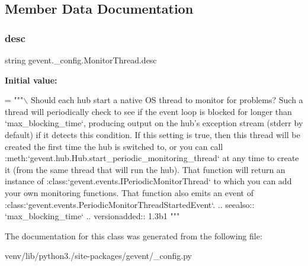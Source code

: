 \subsection{Member Data Documentation}
\mbox{\label{classgevent_1_1__config_1_1_monitor_thread_aee95dd332101471a7376df85a83ef546}} 
\subsubsection{\texorpdfstring{desc}{desc}}
{\footnotesize\ttfamily string gevent.\+\_\+config.\+Monitor\+Thread.\+desc\hspace{0.3cm}{\ttfamily [static]}}

{\bfseries Initial value\+:}
\begin{DoxyCode}
=  \textcolor{stringliteral}{"""\(\backslash\)}
\textcolor{stringliteral}{Should each hub start a native OS thread to monitor}
\textcolor{stringliteral}{for problems?}
\textcolor{stringliteral}{}
\textcolor{stringliteral}{Such a thread will periodically check to see if the event loop}
\textcolor{stringliteral}{is blocked for longer than `max\_blocking\_time`, producing output on}
\textcolor{stringliteral}{the hub's exception stream (stderr by default) if it detects this condition.}
\textcolor{stringliteral}{}
\textcolor{stringliteral}{If this setting is true, then this thread will be created}
\textcolor{stringliteral}{the first time the hub is switched to,}
\textcolor{stringliteral}{or you can call :meth:`gevent.hub.Hub.start\_periodic\_monitoring\_thread` at any}
\textcolor{stringliteral}{time to create it (from the same thread that will run the hub). That function}
\textcolor{stringliteral}{will return an instance of :class:`gevent.events.IPeriodicMonitorThread`}
\textcolor{stringliteral}{to which you can add your own monitoring functions. That function}
\textcolor{stringliteral}{also emits an event of :class:`gevent.events.PeriodicMonitorThreadStartedEvent`.}
\textcolor{stringliteral}{}
\textcolor{stringliteral}{.. seealso:: `max\_blocking\_time`}
\textcolor{stringliteral}{}
\textcolor{stringliteral}{.. versionadded:: 1.3b1}
\textcolor{stringliteral}{"""}
\end{DoxyCode}


The documentation for this class was generated from the following file\+:\begin{DoxyCompactItemize}
\item 
venv/lib/python3./site-\/packages/gevent/\+\_\+config.\+py\end{DoxyCompactItemize}

